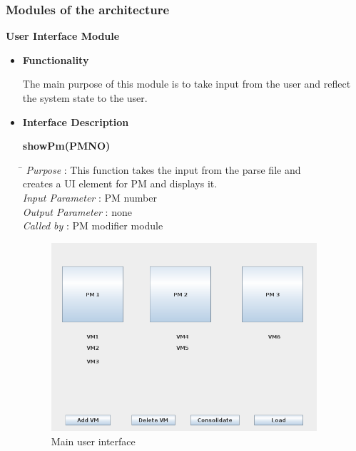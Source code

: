 \documentclass[a4paper,11pt]{article}
\begin{document}
\subsubsection{Modules of the architecture }
\textbf{User Interface Module}
\begin{itemize}
 \item \textbf{Functionality}
 
 The main purpose of this module is to take input from the user and reflect the system state to the user. 
  \item \textbf{Interface Description} 
  
  \textbf{showPm(PM\textunderscore NO)}
  
  
\begin{tabbing}
\hspace*{4cm}\=  \kill
 \textit{Purpose} \> : This function takes the input from the parse file and \\ \>creates a UI element for PM and displays it.\\
  \textit{Input Parameter} \> : PM number \\
  \textit{Output Parameter} \> : none \\
  \textit{Called by} \> : PM modifier module 
  
\end{tabbing}

\begin{figure}[h]
\centering
\includegraphics[height=7cm]{images/GUI.png}
\caption{Main user interface}
\label{fig:GUI}


\end{figure}
\end{itemize}
\end{document}
